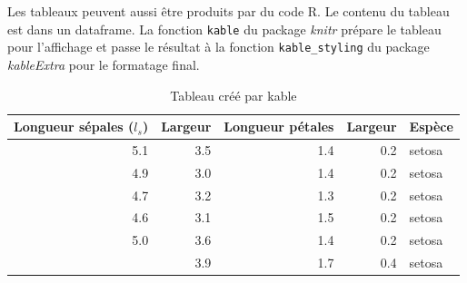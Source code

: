 \documentclass[
  12pt,
  french,
  a4paper,
  extrafontsizes,onecolumn,openright
  ]{memoir}
\newenvironment{Shaded}{\begin{snugshade}}{\end{snugshade}}
\newcommand{\DataTypeTok}[1]{\textcolor[rgb]{0.13,0.29,0.53}{#1}}
\newcommand{\KeywordTok}[1]{\textcolor[rgb]{0.13,0.29,0.53}{\textbf{#1}}}
\newcommand{\NormalTok}[1]{#1}
\newcommand{\OperatorTok}[1]{\textcolor[rgb]{0.81,0.36,0.00}{\textbf{#1}}}
\newcommand{\OtherTok}[1]{\textcolor[rgb]{0.56,0.35,0.01}{#1}}
\newcommand{\StringTok}[1]{\textcolor[rgb]{0.31,0.60,0.02}{#1}}
\begin{document}
Les tableaux peuvent aussi être produits par du code R.
Le contenu du tableau est dans un dataframe.
La fonction \texttt{kable} du package \emph{knitr} prépare le tableau pour l'affichage et passe le résultat à la fonction \texttt{kable\_styling} du package \emph{kableExtra} pour le formatage final.

\scriptsize

\begin{Shaded}
\end{Shaded}

\begin{table}

\caption{\label{tab:kable}Tableau créé par kable}
\centering
\begin{tabular}[t]{rrrrl}
\toprule
Longueur sépales ($l_s$) & Largeur & Longueur pétales & Largeur & Espèce\\
\midrule
5.1 & 3.5 & 1.4 & 0.2 & setosa\\
4.9 & 3.0 & 1.4 & 0.2 & setosa\\
4.7 & 3.2 & 1.3 & 0.2 & setosa\\
4.6 & 3.1 & 1.5 & 0.2 & setosa\\
5.0 & 3.6 & 1.4 & 0.2 & setosa\\
\addlinespace
5.4 & 3.9 & 1.7 & 0.4 & setosa\\
\bottomrule
\end{tabular}
\end{table}

\normalsize
\end{document}
